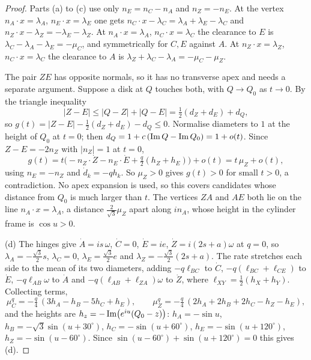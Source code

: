 \begin{proof}
Parts (a) to (c) use only $n_E=n_C-n_A$ and $n_Z=-n_E$. At the vertex $n_A\cdot x=\lambda_A$, $n_E\cdot x=\lambda_E$ one gets
$n_C\cdot x-\lambda_C=\lambda_A+\lambda_E-\lambda_C$ and $n_Z\cdot x-\lambda_Z=-\lambda_E-\lambda_Z$. At $n_A\cdot x=\lambda_A$, $n_C\cdot x=\lambda_C$ the
clearance to $E$ is $\lambda_C-\lambda_A-\lambda_E=-\mu_C$, and symmetrically for $C,E$ against $A$. At $n_Z\cdot x=\lambda_Z$,
$n_C\cdot x=\lambda_C$ the clearance to $A$ is $\lambda_Z+\lambda_C-\lambda_A=-\mu_C-\mu_Z$.

The pair $ZE$ has opposite normals, so it has no transverse apex and needs a separate argument. Suppose
a disk at $Q$ touches both, with $Q\to Q_0$ as $t\to0$. By the triangle inequality
\[
|Z-E|\le|Q-Z|+|Q-E|=\tfrac12(d_Z+d_E)+d_Q,
\]
so $g(t)=|Z-E|-\tfrac12(d_Z+d_E)-d_Q\le0$. Normalise diameters to $1$ at the height of $Q_0$ at $t=0$;
then $d_Q=1+c\,(\operatorname{Im} Q-\operatorname{Im} Q_0)=1+o(t)$. Since $Z-E=-2n_Z$ with $|n_Z|=1$ at $t=0$,
\[
g(t)=t\bigl(-n_Z\cdot\dot Z-n_E\cdot\dot E+\tfrac q2(h_Z+h_E)\bigr)+o(t)=t\,\mu_Z+o(t),
\]
using $n_E=-n_Z$ and $\dot d_k=-qh_k$. So $\mu_Z>0$ gives $g(t)>0$ for small $t>0$, a contradiction. No
apex expansion is used, so this covers candidates whose distance from $Q_0$ is much larger than $t$.
The vertices $ZA$ and $AE$ both lie on
the line $n_A\cdot x=\lambda_A$, a distance $\tfrac2{\sqrt3}\mu_Z$ apart along $in_A$, whose height in the cylinder
frame is $\cos u>0$.

(d) The hinges give $\dot A=is\,\omega$, $\dot C=0$, $\dot E=ie$, $\dot Z=i(2s+a)\omega$ at $q=0$, so
$\lambda_A=-\tfrac{\sqrt3}2s$, $\lambda_C=0$, $\lambda_E=\tfrac{\sqrt3}2e$ and $\lambda_Z=-\tfrac{\sqrt3}2(2s+a)$. The rate stretches
each side to the mean of its two diameters, adding $-q\ell_{BC}$ to $\dot C$, $-q(\ell_{BC}+\ell_{CE})$ to $\dot E$,
$-q\ell_{AB}\omega$ to $\dot A$ and $-q(\ell_{AB}+\ell_{ZA})\omega$ to $\dot Z$, where $\ell_{XY}=\tfrac12(h_X+h_Y)$.
Collecting terms,
\[
\mu_C^{q}=-\tfrac q4\,(3h_A-h_B-5h_C+h_E),\qquad \mu_Z^{q}=-\tfrac q4\,(2h_A+2h_B+2h_C-h_Z-h_E),
\]
and the heights are $h_z=-\operatorname{Im}\bigl(e^{iu}(Q_0-z)\bigr)$: $h_A=-\sin u$, $h_B=-\sqrt3\sin(u+30^\circ)$,
$h_C=-\sin(u+60^\circ)$, $h_E=-\sin(u+120^\circ)$, $h_Z=-\sin(u-60^\circ)$. Since
$\sin(u-60^\circ)+\sin(u+120^\circ)=0$ this gives (d).
\end{proof}


